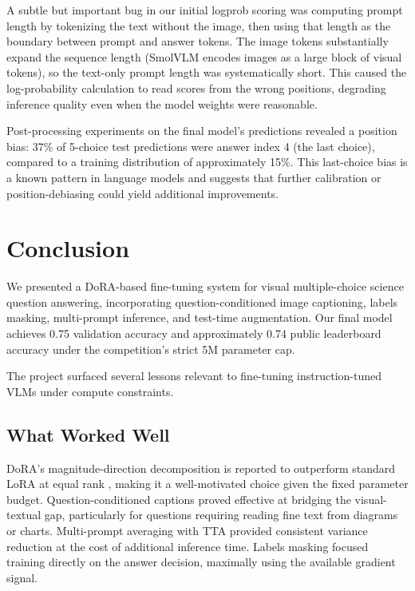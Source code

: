 \documentclass[11pt]{article}
\begin{document}
A subtle but important bug in our initial logprob scoring was computing prompt length by tokenizing the text without the image, then using that length as the boundary between prompt and answer tokens. The image tokens substantially expand the sequence length (SmolVLM encodes images as a large block of visual tokens), so the text-only prompt length was systematically short. This caused the log-probability calculation to read scores from the wrong positions, degrading inference quality even when the model weights were reasonable.

Post-processing experiments on the final model's predictions revealed a position bias: 37\% of 5-choice test predictions were answer index 4 (the last choice), compared to a training distribution of approximately 15\%. This last-choice bias is a known pattern in language models and suggests that further calibration or position-debiasing could yield additional improvements.

\section{Conclusion}

We presented a DoRA-based fine-tuning system for visual multiple-choice science question answering, incorporating question-conditioned image captioning, labels masking, multi-prompt inference, and test-time augmentation. Our final model achieves 0.75 validation accuracy and approximately 0.74 public leaderboard accuracy under the competition's strict 5M parameter cap.

The project surfaced several lessons relevant to fine-tuning instruction-tuned VLMs under compute constraints.

\subsection{What Worked Well}

DoRA's magnitude-direction decomposition is reported to outperform standard LoRA at equal rank \cite{liu2024dora}, making it a well-motivated choice given the fixed parameter budget. Question-conditioned captions proved effective at bridging the visual-textual gap, particularly for questions requiring reading fine text from diagrams or charts. Multi-prompt averaging with TTA provided consistent variance reduction at the cost of additional inference time. Labels masking focused training directly on the answer decision, maximally using the available gradient signal.
\end{document}
